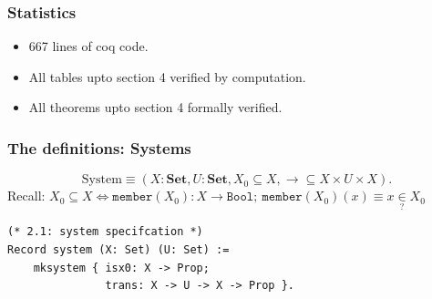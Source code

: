 \documentclass{beamer}
\begin{document}
\begin{frame}[fragile]
\frametitle{Statistics}
    \begin{itemize}
            \item  667 lines of coq code.
            \pause
            \item All tables upto section 4 verified by computation.
            \item All theorems upto section 4 formally verified.
    \end{itemize}
\end{frame}

\begin{frame}[fragile]
\frametitle{The definitions: Systems}

{\footnotesize
$$
\text{System} \equiv (X: \textbf{Set}, U: \textbf{Set}, X_0 \subseteq X, \rightarrow \subseteq X \times U \times X).
$$
\pause
    Recall: $X_0 \subseteq X \iff \texttt{member}(X_0): X \rightarrow \texttt{Bool}; ~ \texttt{member}(X_0)(x) \equiv x \underset{?}{\in} X_0$
\pause
\begin{verbatim}
(* 2.1: system specifcation *)
Record system (X: Set) (U: Set) := 
    mksystem { isx0: X -> Prop; 
               trans: X -> U -> X -> Prop }.
\end{verbatim}
}

\end{frame}
\end{document}
